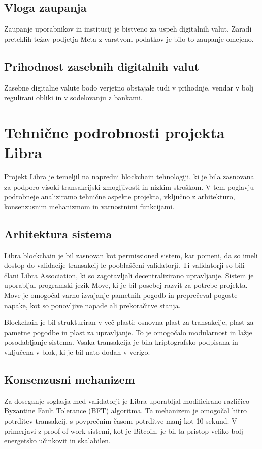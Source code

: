\documentclass[12pt,a4paper]{article}
\begin{document}
\subsection{Vloga zaupanja}
Zaupanje uporabnikov in institucij je bistveno za uspeh digitalnih valut. Zaradi preteklih težav podjetja Meta z varstvom podatkov je bilo to zaupanje omejeno.

\subsection{Prihodnost zasebnih digitalnih valut}
Zasebne digitalne valute bodo verjetno obstajale tudi v prihodnje, vendar v bolj regulirani obliki in v sodelovanju z bankami.

\section{Tehnične podrobnosti projekta Libra}

Projekt Libra je temeljil na napredni blockchain tehnologiji, ki je bila zasnovana za podporo visoki transakcijski zmogljivosti in nizkim stroškom. V tem poglavju podrobneje analiziramo tehnične aspekte projekta, vključno z arhitekturo, konsenzusnim mehanizmom in varnostnimi funkcijami.

\subsection{Arhitektura sistema}
Libra blockchain je bil zasnovan kot permissioned sistem, kar pomeni, da so imeli dostop do validacije transakcij le pooblaščeni validatorji. Ti validatorji so bili člani Libra Association, ki so zagotavljali decentralizirano upravljanje. Sistem je uporabljal programski jezik Move, ki je bil posebej razvit za potrebe projekta. Move je omogočal varno izvajanje pametnih pogodb in preprečeval pogoste napake, kot so ponovljive napade ali prekoračitve stanja.

Blockchain je bil strukturiran v več plasti: osnovna plast za transakcije, plast za pametne pogodbe in plast za upravljanje. To je omogočalo modularnost in lažje posodabljanje sistema. Vsaka transakcija je bila kriptografsko podpisana in vključena v blok, ki je bil nato dodan v verigo.

\subsection{Konsenzusni mehanizem}
Za doseganje soglasja med validatorji je Libra uporabljal modificirano različico Byzantine Fault Tolerance (BFT) algoritma. Ta mehanizem je omogočal hitro potrditev transakcij, s povprečnim časom potrditve manj kot 10 sekund. V primerjavi z proof-of-work sistemi, kot je Bitcoin, je bil ta pristop veliko bolj energetsko učinkovit in skalabilen.
\end{document}
